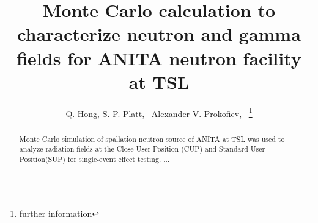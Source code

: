 \documentclass[11pt,a4paper]{IEEEtran}
\begin{document}
\title{Monte Carlo calculation to characterize neutron and gamma fields for ANITA neutron facility at TSL}

\author{Q. Hong,
S. P. Platt,~
Alexander V. Prokofiev,~
\thanks{further information}\\[2mm] 	%
\vspace{-5mm}
}



\maketitle %

\begin{abstract}
Monte Carlo simulation of spallation neutron source of ANITA at TSL was used to analyze radiation fields at the Close User Position (CUP) and Standard User Position(SUP) for single-event effect testing. ...
\end{abstract}




\IEEEpeerreviewmaketitle
\end{document}
